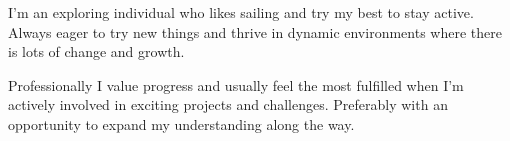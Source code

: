 \documentclass[a4paper]{twentysecondcv} %
\begin{document}



{\hspace{1em}
I'm an exploring individual who likes sailing and try my best to stay active. Always eager to try new things and thrive in dynamic environments where there is lots of change and growth.

Professionally I value progress and usually feel the most fulfilled when I'm actively involved in exciting projects and challenges. Preferably with an opportunity to expand my understanding along the way.
}






{
               
           
        
            
               
        
             
         
             
}

\makeprofile %

\end{document}
